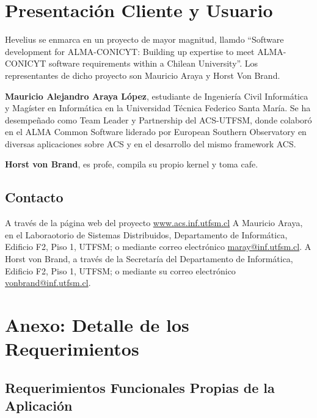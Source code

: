 \documentclass[letterpaper,spanish,10pt]{article}
\begin{document}
\newpage


\section{Presentaci\'on Cliente y Usuario}
Hevelius se enmarca en un proyecto de mayor magnitud, llamdo ``Software development for ALMA-CONICYT: Building up expertise to meet ALMA-CONICYT software requirements within a Chilean University''. Los representantes de dicho proyecto son Mauricio Araya y Horst Von Brand.

{\bf Mauricio Alejandro Araya L\'opez}, estudiante de Ingenier\'ia Civil Inform\'atica y Mag\'ister en Inform\'atica en la Universidad T\'ecnica Federico Santa Mar\'ia. Se ha desempe\~nado como Team Leader y Partnership del ACS-UTFSM, donde colabor\'o en el ALMA Common Software
liderado por European Southern Observatory en diversas aplicaciones sobre ACS y en el desarrollo del mismo framework ACS. 

{\bf Horst von Brand}, es profe, compila su propio kernel y toma cafe.





\subsection{Contacto}
A trav\'es de la p\'agina web del proyecto \url{www.acs.inf.utfsm.cl}
A Mauricio Araya, en el Laboraotorio de Sistemas Distribuidos, Departamento de Inform\'atica, Edificio F2, Piso 1, UTFSM; o mediante correo electr\'onico \url{maray@inf.utfsm.cl}.
A Horst von Brand, a trav\'es de la Secretar\'ia del Departamento de Inform\'atica, Edificio F2, Piso 1, UTFSM; o mediante su correo electr\'onico \url{vonbrand@inf.utfsm.cl}.


\newpage


\section{Anexo: Detalle de los Requerimientos}

\subsection{Requerimientos Funcionales Propias de la Aplicaci\'on}
\end{document}
